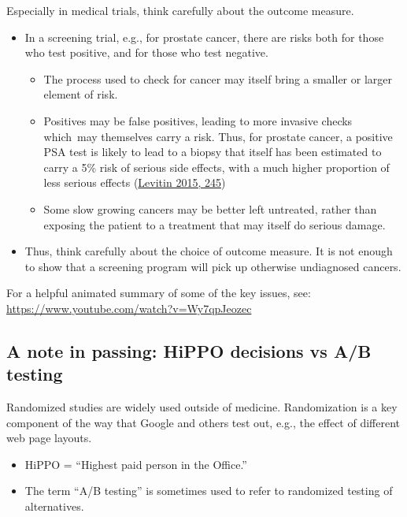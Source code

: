 \documentclass[
  10pt,
  b5paper]{book}
\providecommand{\tightlist}{%
  \setlength{\itemsep}{0pt}\setlength{\parskip}{0pt}}
\begin{document}
Especially in medical trials, think carefully about the outcome measure.

\begin{itemize}
\tightlist
\item
  In a screening trial, e.g., for prostate cancer, there are
  risks both for those who test positive, and for
  those who test negative.

  \begin{itemize}
  \tightlist
  \item
    The process used to check for cancer may itself bring
    a smaller or larger element of risk.
  \item
    Positives may be false positives, leading to more invasive
    checks which~may themselves carry a risk. Thus, for prostate
    cancer, a positive PSA test is likely to lead to a biopsy that
    itself has been estimated to carry a 5\% risk of serious side
    effects, with a much higher proportion of less serious effects
    (\protect\hyperlink{ref-levitin_2015}{Levitin 2015, 245})
  \item
    Some slow growing cancers may be better left untreated,
    rather than exposing the patient to a treatment that may itself
    do serious damage.
  \end{itemize}
\item
  Thus, think carefully about the choice of outcome measure. It is not
  enough to show that a screening program will pick up otherwise
  undiagnosed cancers.
\end{itemize}

For a helpful animated summary of some of the key issues, see:\\
\url{https://www.youtube.com/watch?v=Wy7qpJeozec}

\hypertarget{a-note-in-passing-hippo-decisions-vs-ab-testing}{%
\subsection*{A note in passing: HiPPO decisions vs A/B testing}\label{a-note-in-passing-hippo-decisions-vs-ab-testing}}

Randomized studies are widely used outside of medicine.
Randomization is a key component of the way that Google and
others test out, e.g., the effect of different web page layouts.

\begin{itemize}
\tightlist
\item
  HiPPO = ``Highest paid person in the Office.''
\item
  The term ``A/B testing'' is sometimes used to refer to randomized
  testing of alternatives.
\end{itemize}
\end{document}
